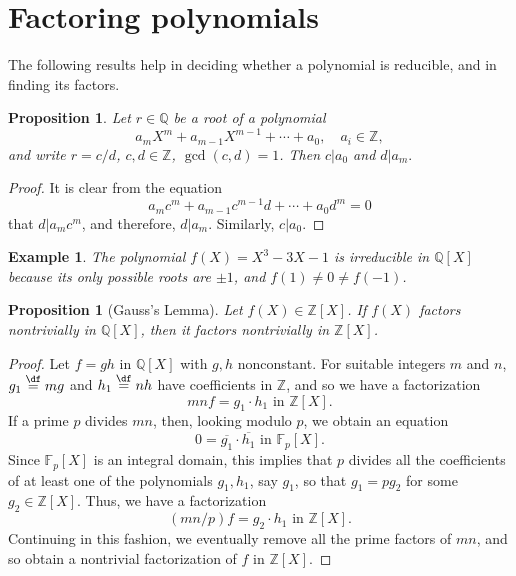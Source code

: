 \documentclass[a4paper,11pt,final,openany]{memoir}
\newtheorem{proposition}[X]{Proposition}
\newtheorem{example}[X]{Example}
\theoremstyle{nonumberplain}
\newtheorem{proof}{Proof.}
\begin{document}
\section{Factoring polynomials}

The following results help in deciding whether a polynomial is reducible, and
in finding its factors.

\begin{proposition}
\label{ef4}Let $r\in\mathbb{Q}{}$ be a root of a polynomial
\[
a_{m}X^{m}+a_{m-1}X^{m-1}+\cdots+a_{0},\quad a_{i}\in\mathbb{Z},
\]
and write $r=c/d$, $c,d\in\mathbb{Z}$, $\gcd(c,d)=1$. Then $c|a_{0}$ and
$d|a_{m}.$
\end{proposition}

\begin{proof}
It is clear from the equation
\[
a_{m}c^{m}+a_{m-1}c^{m-1}d+\cdots+a_{0}d^{m}=0
\]
that $d|a_{m}c^{m}$, and therefore, $d|a_{m}.$ Similarly, $c|a_{0}$.
\end{proof}

\begin{example}
\label{ef5}The polynomial $f(X)=X^{3}-3X-1$ is irreducible in $\mathbb{Q}[X]$
because its only possible roots are $\pm1$, and $f(1)\neq0\neq f(-1)$.
\end{example}

\begin{proposition}
[Gauss's Lemma]\label{ef6}%
%
Let $f(X)\in\mathbb{Z}[X]$. If $f(X)$ factors nontrivially in $\mathbb{Q}[X]$,
then it factors nontrivially in $\mathbb{Z}{}[X]$.
\end{proposition}

\begin{proof}
Let $f=gh$ in $\mathbb{Q}{}[X]$ with $g,h$ nonconstant${}$. For suitable
integers $m$ and $n$, $g_{1}\overset{\df}{=}mg$ and
$h_{1}\overset{\df}{=}nh$ have coefficients in $\mathbb{Z}{}%
$, and so we have a factorization%
\[
mnf=g_{1}\cdot h_{1}\text{ in }\mathbb{Z}{}[X]\text{.}%
\]
If a prime $p$ divides $mn$, then, looking modulo $p$, we obtain an equation%
\[
0=\overline{g_{1}}\cdot\overline{h_{1}}\text{ in }\mathbb{F}{}_{p}[X]\text{.}%
\]
Since $\mathbb{F}_{p}[X]$ is an integral domain, this implies that $p$ divides
all the coefficients of at least one of the polynomials $g_{1},h_{1}$, say
$g_{1}$, so that $g_{1}=pg_{2}$ for some $g_{2}\in\mathbb{Z}[X]$. Thus, we
have a factorization%
\[
(mn/p)f=g_{2}\cdot h_{1}\text{ in }\mathbb{Z}{}[X]\text{.}%
\]
Continuing in this fashion, we eventually remove all the prime factors of
$mn$, and so obtain a nontrivial factorization of $f$ in $\mathbb{Z}{}[X]$.
\end{proof}
\end{document}
